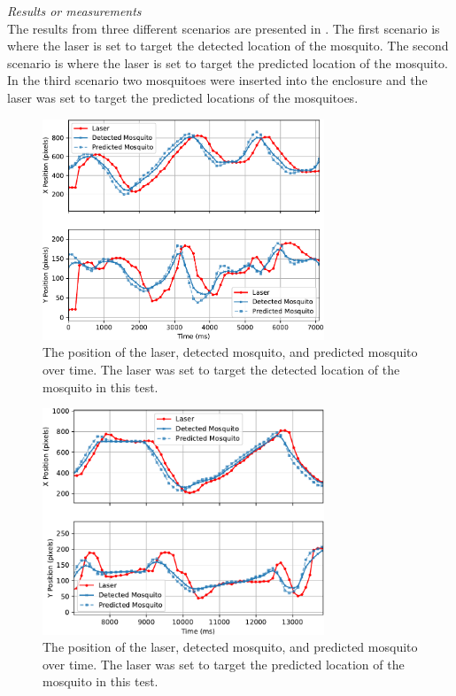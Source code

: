 \textit{Results or measurements}\\
The results from three different scenarios are presented in . The first scenario is where the laser is set to target the detected location of the mosquito. The second scenario is where the laser is set to target the predicted location of the mosquito. In the third scenario two mosquitoes were inserted into the enclosure and the laser was set to target the predicted locations of the mosquitoes.
\begin{figure}[!htb]
  \centering
  \includegraphics[width=0.75\textwidth]{figures/results/q1_1mos_detection_10fps.pdf}
  \caption{The position of the laser, detected mosquito, and predicted mosquito over time. The laser was set to target the detected location of the mosquito in this test.}
  \label{fig:q1_1mos_detection_10fps}
\end{figure}
\begin{figure}[!htb]
  \centering
  \includegraphics[width=0.75\textwidth]{figures/results/q1_1mos_prediction_10fps.pdf}
  \caption{The position of the laser, detected mosquito, and predicted mosquito over time. The laser was set to target the predicted location of the mosquito in this test.}
  \label{fig:q1_1mos_prediction_10fps}
\end{figure}

